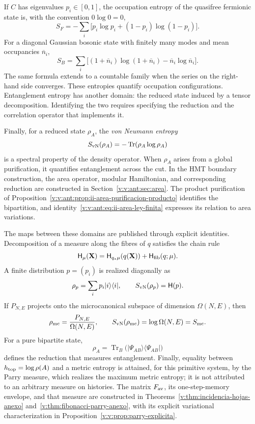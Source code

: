 If \(C\) has eigenvalues \(p_i\in[0,1]\), the occupation entropy of the
quasifree fermionic state is, with the convention \(0\log0=0\),
\begin{equation}
 S_F=-\sum_i\bigl[p_i\log p_i+(1-p_i)\log(1-p_i)\bigr].
 \label{v:v:rec:eq:entropia-cuasilibre-fermi-rev3}
\end{equation}
For a diagonal Gaussian bosonic state with finitely many modes and mean
occupancies \(\overline n_i\),
\begin{equation}
 S_B=\sum_i\bigl[(1+\overline n_i)\log(1+\overline n_i)
                  -\overline n_i\log\overline n_i\bigr].
 \label{v:v:rec:eq:entropia-gaussiana-bose-rev3}
\end{equation}
The same formula extends to a countable family when the series on the
right-hand side converges.
These entropies quantify occupation configurations. Entanglement entropy
has another domain: the reduced state induced by a tensor
decomposition. Identifying the two requires specifying the reduction and the
correlation operator that implements it.

Finally, for a reduced state \(\rho_A\), the \emph{von Neumann
entropy}
\[
 S_{\rm vN}(\rho_A)=-\operatorname{Tr}(\rho_A\log\rho_A)
\]
is a spectral property of the density operator. When \(\rho_A\)
arises from a global purification, it quantifies entanglement across
the cut. In the HMT boundary construction, the area operator, modular
Hamiltonian, and corresponding reduction are constructed in
Section~\ref{v:v:ant:sec:area}. The product purification of
Proposition~\ref{v:v:ant:prop:ii-area-purificacion-producto} identifies
the bipartition, and identity~\eqref{v:v:ant:eq:ii-area-ley-finita}
expresses its relation to area variations.

\newpage
The maps between these domains are published through explicit identities.
Decomposition of a measure along the fibres of \(q\) satisfies the chain
rule
\begin{equation}
 \mathsf H_\mu(\mathbf X)
 =\mathsf H_{q_*\mu}(q(\mathbf X))
  +\mathsf H_{\rm fib}(q;\mu).
 \label{v:v:rec:eq:cadena-entropia-fibras-rev2}
\end{equation}
A finite distribution \(p=(p_i)\) is realized diagonally as
\[
 \rho_p=\sum_i p_i|i\rangle\langle i|,
 \qquad S_{\rm vN}(\rho_p)=\mathsf H(p).
\]
If \(P_{N,E}\) projects onto the microcanonical subspace of dimension
\(\Omega(N,E)\), then
\[
 \rho_{\rm mc}=\frac{P_{N,E}}{\Omega(N,E)},
 \qquad S_{\rm vN}(\rho_{\rm mc})=\log\Omega(N,E)=S_{\rm mc}.
\]
For a pure bipartite state,
\[
 \rho_A=\operatorname{Tr}_B
 \bigl(|\Psi_{AB}\rangle\langle\Psi_{AB}|\bigr)
\]
defines the reduction that measures entanglement. Finally, equality between
\(h_{\rm top}=\log\rho(A)\) and a metric entropy is attained, for this
primitive system, by the Parry measure, which realizes the maximum metric
entropy; it is not attributed to an arbitrary measure on histories. The matrix
\(F_{\rm av}\), its one-step-memory envelope, and that measure are
constructed in Theorems~\ref{v:thm:incidencia-hojas-anexo}
and~\ref{v:thm:fibonacci-parry-anexo}, with its explicit variational
characterization in Proposition~\ref{v:v:prop:parry-explicita}.
